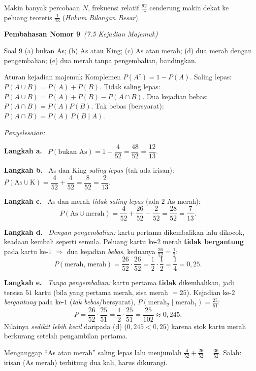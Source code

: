 \documentclass[11pt,a4paper]{article}
\newcommand{\jawab}{\par\smallskip\noindent\textit{\textcolor{oranye}{Penyelesaian:}}\par\smallskip}
\newcommand{\langkah}[1]{\par\smallskip\noindent\textbf{\textcolor{biru}{Langkah #1.}}\ }
\newcommand{\nomorjudul}[2]{\par\bigskip\noindent%
  {\large\bfseries\color{ungu}Pembahasan Nomor #1}\ {\normalfont\itshape\color{gray}(#2)}\par\nopagebreak\smallskip}
\begin{document}
\begin{tips}
Makin banyak percobaan $N$, frekuensi relatif $\tfrac{92}{\cdots}$ cenderung makin
dekat ke peluang teoretis $\tfrac{1}{13}$ (\emph{Hukum Bilangan Besar}).
\end{tips}

\nomorjudul{9}{7.5 Kejadian Majemuk}
\begin{soalbox}{Soal 9}
(a) bukan As; (b) As atau King; (c) As atau merah; (d) dua merah dengan
pengembalian; (e) dua merah tanpa pengembalian, bandingkan.
\end{soalbox}

\begin{ingat}{Aturan kejadian majemuk}
Komplemen $P(A^c)=1-P(A)$. Saling lepas: $P(A\cup B)=P(A)+P(B)$. Tidak saling
lepas: $P(A\cup B)=P(A)+P(B)-P(A\cap B)$. Dua kejadian bebas:
$P(A\cap B)=P(A)P(B)$. Tak bebas (bersyarat): $P(A\cap B)=P(A)\,P(B\mid A)$.
\end{ingat}

\jawab
\langkah{a} $P(\text{bukan As})=1-\dfrac{4}{52}=\dfrac{48}{52}=\dfrac{12}{13}$.

\langkah{b} As dan King \emph{saling lepas} (tak ada irisan):
$P(\mathrm{As}\cup\mathrm{K})=\dfrac{4}{52}+\dfrac{4}{52}=\dfrac{8}{52}=\dfrac{2}{13}$.

\langkah{c} As dan merah \emph{tidak saling lepas} (ada $2$ As merah):
\[
P(\mathrm{As}\cup\text{merah})=\dfrac{4}{52}+\dfrac{26}{52}-\dfrac{2}{52}
=\dfrac{28}{52}=\dfrac{7}{13}.
\]

\langkah{d} \emph{Dengan pengembalian:} kartu pertama dikembalikan lalu dikocok,
keadaan kembali seperti semula. Peluang kartu ke-$2$ merah \textbf{tidak bergantung}
pada kartu ke-$1$ $\Rightarrow$ dua kejadian \emph{bebas}, keduanya $\tfrac{26}{52}=\tfrac12$:
\[
P(\text{merah, merah})=\dfrac{26}{52}\cdot\dfrac{26}{52}=\dfrac12\cdot\dfrac12=\dfrac14=0{,}25.
\]

\langkah{e} \emph{Tanpa pengembalian:} kartu pertama \textbf{tidak} dikembalikan,
jadi tersisa $51$ kartu (bila yang pertama merah, sisa merah $=25$). Kejadian ke-$2$
\emph{bergantung} pada ke-$1$ (\emph{tak bebas}/bersyarat),
$P(\text{merah}_2\mid\text{merah}_1)=\tfrac{25}{51}$:
\[
P=\dfrac{26}{52}\cdot\dfrac{25}{51}=\dfrac12\cdot\dfrac{25}{51}=\dfrac{25}{102}\approx0{,}245.
\]
Nilainya \emph{sedikit lebih kecil} daripada (d) ($0{,}245<0{,}25$) karena stok kartu
merah berkurang setelah pengambilan pertama.

\begin{jebakan}
Menganggap ``As atau merah'' saling lepas lalu menjumlah $\tfrac{4}{52}+\tfrac{26}{52}
=\tfrac{30}{52}$. Salah: irisan (As merah) terhitung dua kali, harus dikurangi.
\end{jebakan}
\end{document}
